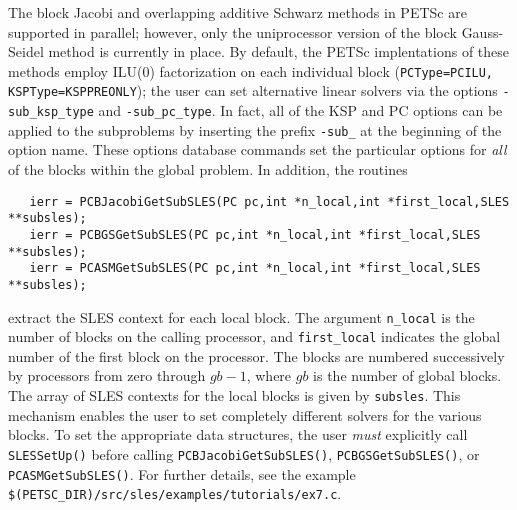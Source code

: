  
  
The block Jacobi and overlapping additive Schwarz methods in PETSc are
supported in parallel; however, only the uniprocessor
version of the block Gauss-Seidel method is currently in place.
By default, the PETSc implentations of these methods
employ ILU(0) factorization on each individual block ({\tt PCType=PCILU,
KSPType=KSPPREONLY}); the user can set alternative linear solvers via the options 
 
{\tt -sub\_ksp\_type} and {\tt -sub\_pc\_type}. In fact, all of the KSP
and PC options can be applied to the subproblems by inserting the prefix
{\tt -sub\_} at the beginning of the option name. 
These options database commands set the particular options for {\em all} 
of the blocks within the global problem.  In addition, the routines
\begin{verbatim}
   ierr = PCBJacobiGetSubSLES(PC pc,int *n_local,int *first_local,SLES **subsles);
   ierr = PCBGSGetSubSLES(PC pc,int *n_local,int *first_local,SLES **subsles);
   ierr = PCASMGetSubSLES(PC pc,int *n_local,int *first_local,SLES **subsles);
\end{verbatim}
extract the  SLES context for each local 
block.  The argument {\tt n\_local} is the number of blocks on the 
calling processor, and {\tt first\_local} indicates the global number 
of the first block on the processor. The blocks are numbered 
successively by processors from zero through $gb-1$, 
where $gb$ is the number of global blocks.  
The array of SLES contexts for the local blocks is given by {\tt subsles}. 
This mechanism enables the user to set completely different solvers for the 
various blocks.  To set the appropriate data structures, the 
user {\em must} explicitly call {\tt SLESSetUp()}  
before calling {\tt PCBJacobiGetSubSLES()}, {\tt PCBGSGetSubSLES()}, or
{\tt PCASMGetSubSLES()}.
For further details, see the 
example {\tt \$(PETSC\_DIR)/src/sles/examples/tutorials/ex7.c}.

